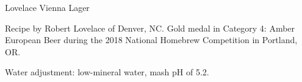 \begin{recipe}{Lovelace Vienna Lager} %

\begin{aboutblock}
Recipe by Robert Lovelace of Denver, NC. Gold medal in Category 4: Amber European
Beer during the 2018 National Homebrew Competition in Portland, OR. \sourceaha
\end{aboutblock}


\begin{methodandtiming}
 
\begin{mashsteps}
\end{mashsteps}

\begin{fermentationsteps}
\end{fermentationsteps}

\begin{directions}
Water adjustment: low-mineral water, mash pH of 5.2.
\end{directions}

\end{methodandtiming}

\recipebreak

\begin{ingredientsblock}

\begin{malts}
\end{malts}

\begin{hops}
\end{hops}


\end{ingredientsblock}

\end{recipe}

